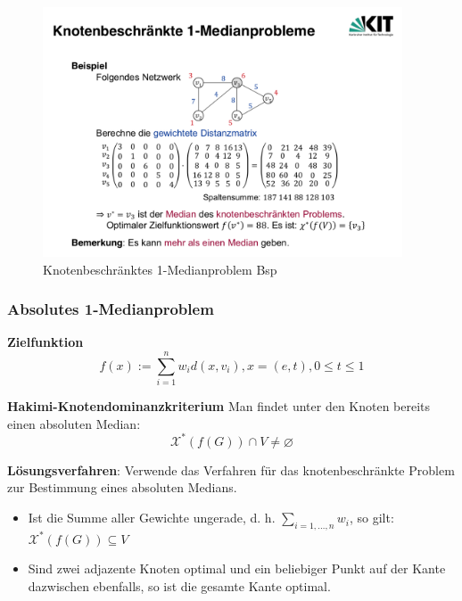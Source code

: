         \begin{figure}[H]
          \centering
          \includegraphics[width=0.95\textwidth]{Images/Knotenbeschraenktes_1_median_Problem_Bsp.png}
          \caption{Knotenbeschränktes 1-Medianproblem Bsp}
          \label{fig:Knotenbeschraenktes_1_median_Problem_Bsp}
        \end{figure}


      \subsubsection{Absolutes 1-Medianproblem} %
      \label{ssub:absolutes_1_medianproblem}

        \par \textbf{Zielfunktion}
        $$
        f(x):= \sum_{i = 1}^{n}w_id(x, v_i), x = (e,t), 0 \leq t \leq 1
        $$

        \par \textbf{Hakimi-Knotendominanzkriterium}
        Man findet unter den Knoten bereits einen absoluten Median:
        \[
          \mathcal{X}^*(f(G)) \cap V \neq \varnothing
        \]

        \par \textbf{Lösungsverfahren}: Verwende das Verfahren für das knotenbeschränkte Problem zur Bestimmung eines absoluten Medians.

        \begin{itemize}
          \item Ist die Summe aller Gewichte ungerade, d. h. $\sum_{i = 1, \dots, n}w_i$, so gilt: $\mathcal{X}^*(f(G)) \subseteq V$
          \item Sind zwei adjazente Knoten optimal und ein beliebiger Punkt auf der Kante dazwischen ebenfalls, so ist die gesamte Kante optimal.
        \end{itemize}

